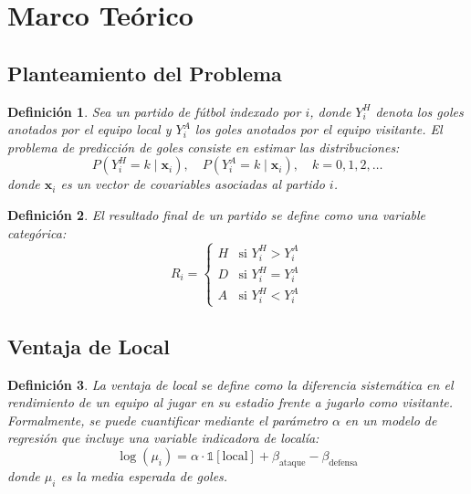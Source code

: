 \documentclass[a4paper,12pt]{article}
\newtheorem{definition}{Definición}
\begin{document}
\section{Marco Teórico}

\subsection{Planteamiento del Problema}

\begin{definition}
Sea un partido de fútbol indexado por $i$, donde $Y_i^H$ denota los goles anotados por el equipo local y $Y_i^A$ los goles anotados por el equipo visitante. El problema de predicción de goles consiste en estimar las distribuciones:
\begin{equation}
P(Y_i^H = k \mid \mathbf{x}_i), \quad P(Y_i^A = k \mid \mathbf{x}_i), \quad k = 0, 1, 2, \ldots
\end{equation}
donde $\mathbf{x}_i$ es un vector de covariables asociadas al partido $i$.
\end{definition}

\begin{definition}
El resultado final de un partido se define como una variable categórica:
\begin{equation}
R_i = \begin{cases} H & \text{si } Y_i^H > Y_i^A \\ D & \text{si } Y_i^H = Y_i^A \\ A & \text{si } Y_i^H < Y_i^A \end{cases}
\end{equation}
\end{definition}

\subsection{Ventaja de Local}

\begin{definition}
La ventaja de local se define como la diferencia sistemática en el rendimiento de un equipo al jugar en su estadio frente a jugarlo como visitante. Formalmente, se puede cuantificar mediante el parámetro $\alpha$ en un modelo de regresión que incluye una variable indicadora de localía:
\begin{equation}
\log(\mu_i) = \alpha \cdot \mathbb{1}[\text{local}] + \beta_{\text{ataque}} - \beta_{\text{defensa}}
\end{equation}
donde $\mu_i$ es la media esperada de goles.
\end{definition}
\end{document}
